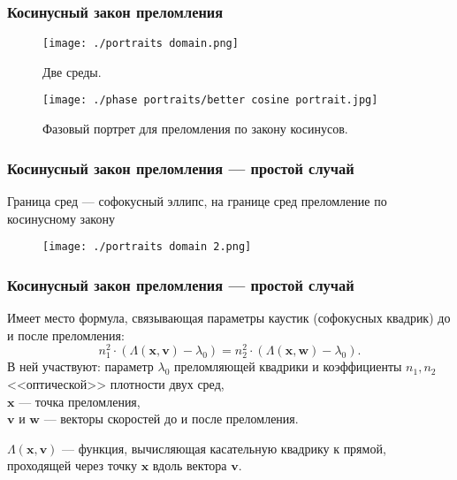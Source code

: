 \begin{frame}\frametitle{Косинусный закон преломления}


\begin{figure}
\begin{minipage}[t]{0.3\linewidth}
        \centering
        \texttt{[image: ./portraits domain.png]}
        \caption{Две среды.}
    \end{minipage}
    \hfill
    \begin{minipage}[t]{0.57\linewidth}
        \centering
        \texttt{[image: ./phase portraits/better cosine portrait.jpg]}
        \caption{Фазовый портрет для преломления по закону косинусов.}
    \end{minipage}
\end{figure}
\end{frame}

\begin{frame}\frametitle{Косинусный закон преломления --- простой случай}

\qq Граница сред --- софокусный эллипс, на границе сред преломление по косинусному закону

\begin{figure}[!htb]
\centering
\texttt{[image: ./portraits domain 2.png]}
\end{figure}
\end{frame}
\note[itemize]{

}

\begin{frame}\frametitle{Косинусный закон преломления --- простой случай}


\begin{mytheorem}

Имеет место формула, связывающая параметры каустик (софокусных квадрик) до и после преломления:
$$n_1^2  \cdot ( \Lambda(\mathbf{x}, \mathbf{v}) - \lambda_0 )= n_2^2 \cdot (\Lambda(\mathbf{x}, \mathbf{w}) - \lambda_0).$$
В ней участвуют:
 параметр $\lambda_0$ преломляющей квадрики и коэффициенты $n_1, n_2$ <<оптической>> плотности двух сред, \\$\mathbf{x}$ --- точка преломления, \\$\mathbf{v}$ и $\mathbf{w}$ --- векторы скоростей до и после преломления.

$\Lambda(\mathbf{x}, \mathbf{v})$ --- функция, вычисляющая касательную квадрику к прямой, проходящей через точку $\mathbf{x}$ вдоль вектора $\mathbf{v}$.
\end{mytheorem}

\end{frame}

